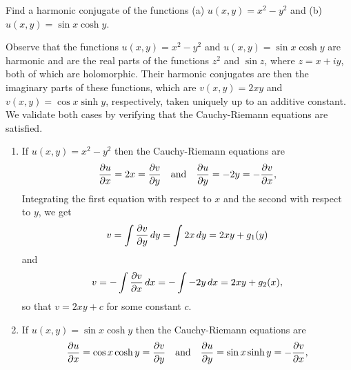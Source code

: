 \begin{example}
    Find a harmonic conjugate of the functions (a) \(u(x, y) = x^2 - y^2\) and (b) \(u(x, y) = \sin x \cosh y\).

    \begin{solution}
        Observe that the functions \(u(x, y) = x^2 - y^2\) and \(u(x, y) = \sin x \cosh y\) are harmonic and are
        the real parts of the functions \(z^2\) and \(\sin z\), where \(z = x + iy\), both of which are holomorphic. Their harmonic conjugates are then the imaginary parts of these functions, which are \(v(x, y) = 2xy\) and \(v(x, y) = \cos x \sinh y\), respectively, taken uniquely up to an additive constant. We validate both cases by verifying that the Cauchy-Riemann equations are satisfied.

        \begin{enumerate}[label=(\alph*), wide]
            \item If \(u(x, y) = x^2 - y^2\) then the Cauchy-Riemann equations are
            \[
                \frac{\partial u}{\partial x} = 2x = \frac{\partial v}{\partial y} \quad \text{and} \quad \frac{\partial u}{\partial y} = -2y = -\frac{\partial v}{\partial x},
            \]
            Integrating the first equation with respect to \(x\) and the second with respect to \(y\), we get
            \[
                v = \int \frac{\partial v}{\partial y}\, dy = \int 2x\, dy = 2xy + g_1(y)
            \]
            and
            \[
                v = -\int \frac{\partial v}{\partial x}\, dx = -\int -2y\, dx = 2xy + g_2(x),
            \]
            so that \(v = 2xy + c\) for some constant \(c\).
            \item If \(u(x, y) = \sin x \cosh y\) then the Cauchy-Riemann equations are
            \[
                \frac{\partial u}{\partial x} = \cos x \cosh y = \frac{\partial v}{\partial y} \quad \text{and} \quad \frac{\partial u}{\partial y} = \sin x \sinh y = -\frac{\partial v}{\partial x},
            \]
        \end{enumerate}
    \end{solution}
\end{example}
